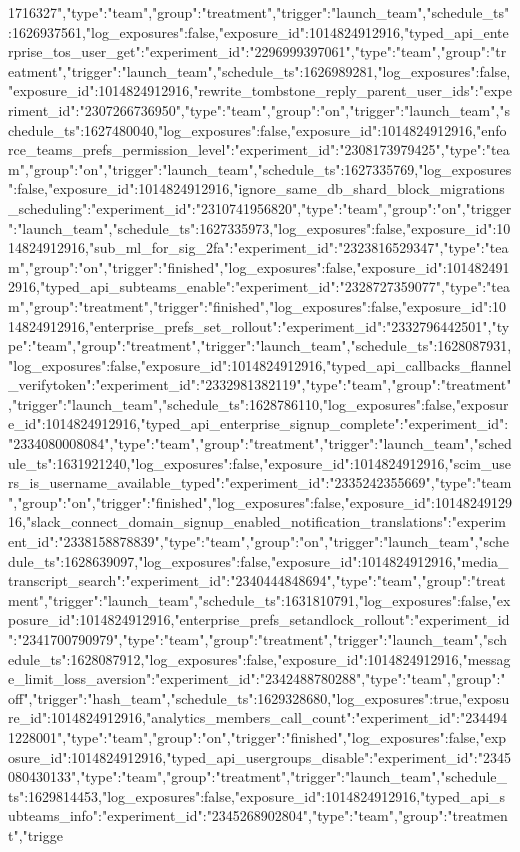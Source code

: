 {1716327","type":"team","group":"treatment","trigger":"launch_team","schedule_ts":1626937561,"log_exposures":false,"exposure_id":1014824912916},"typed_api_enterprise_tos_user_get":{"experiment_id":"2296999397061","type":"team","group":"treatment","trigger":"launch_team","schedule_ts":1626989281,"log_exposures":false,"exposure_id":1014824912916},"rewrite_tombstone_reply_parent_user_ids":{"experiment_id":"2307266736950","type":"team","group":"on","trigger":"launch_team","schedule_ts":1627480040,"log_exposures":false,"exposure_id":1014824912916},"enforce_teams_prefs_permission_level":{"experiment_id":"2308173979425","type":"team","group":"on","trigger":"launch_team","schedule_ts":1627335769,"log_exposures":false,"exposure_id":1014824912916},"ignore_same_db_shard_block_migrations_scheduling":{"experiment_id":"2310741956820","type":"team","group":"on","trigger":"launch_team","schedule_ts":1627335973,"log_exposures":false,"exposure_id":1014824912916},"sub_ml_for_sig_2fa":{"experiment_id":"2323816529347","type":"team","group":"on","trigger":"finished","log_exposures":false,"exposure_id":1014824912916},"typed_api_subteams_enable":{"experiment_id":"2328727359077","type":"team","group":"treatment","trigger":"finished","log_exposures":false,"exposure_id":1014824912916},"enterprise_prefs_set_rollout":{"experiment_id":"2332796442501","type":"team","group":"treatment","trigger":"launch_team","schedule_ts":1628087931,"log_exposures":false,"exposure_id":1014824912916},"typed_api_callbacks_flannel_verifytoken":{"experiment_id":"2332981382119","type":"team","group":"treatment","trigger":"launch_team","schedule_ts":1628786110,"log_exposures":false,"exposure_id":1014824912916},"typed_api_enterprise_signup_complete":{"experiment_id":"2334080008084","type":"team","group":"treatment","trigger":"launch_team","schedule_ts":1631921240,"log_exposures":false,"exposure_id":1014824912916},"scim_users_is_username_available_typed":{"experiment_id":"2335242355669","type":"team","group":"on","trigger":"finished","log_exposures":false,"exposure_id":1014824912916},"slack_connect_domain_signup_enabled_notification_translations":{"experiment_id":"2338158878839","type":"team","group":"on","trigger":"launch_team","schedule_ts":1628639097,"log_exposures":false,"exposure_id":1014824912916},"media_transcript_search":{"experiment_id":"2340444848694","type":"team","group":"treatment","trigger":"launch_team","schedule_ts":1631810791,"log_exposures":false,"exposure_id":1014824912916},"enterprise_prefs_setandlock_rollout":{"experiment_id":"2341700790979","type":"team","group":"treatment","trigger":"launch_team","schedule_ts":1628087912,"log_exposures":false,"exposure_id":1014824912916},"message_limit_loss_aversion":{"experiment_id":"2342488780288","type":"team","group":"off","trigger":"hash_team","schedule_ts":1629328680,"log_exposures":true,"exposure_id":1014824912916},"analytics_members_call_count":{"experiment_id":"2344941228001","type":"team","group":"on","trigger":"finished","log_exposures":false,"exposure_id":1014824912916},"typed_api_usergroups_disable":{"experiment_id":"2345080430133","type":"team","group":"treatment","trigger":"launch_team","schedule_ts":1629814453,"log_exposures":false,"exposure_id":1014824912916},"typed_api_subteams_info":{"experiment_id":"2345268902804","type":"team","group":"treatment","trigge}

